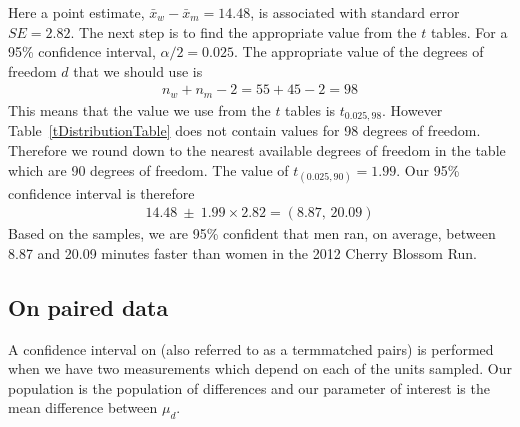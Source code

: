 Here a point estimate, $\bar{x}_{w} - \bar{x}_{m} = 14.48$, is associated with %
standard error $SE=2.82$. 
The next step is to find the appropriate value from the $t$ tables.
For a 95\% confidence interval, $\alpha/2 = 0.025$.
The appropriate value of the degrees of freedom $d$ that we should use is
\begin{align*}
n_{w} + n_{m} - 2 = 55 + 45 - 2 = 98
\end{align*}
This means that the value we use from the $t$ tables is $t_{0.025, 98}$.
However Table~\ref{tDistributionTable} does not contain values for 98 degrees of freedom.
Therefore we round down to the nearest available degrees of freedom in the table which
are 90 degrees of freedom.
The value of $t_{(0.025, 90)} = 1.99$.
Our 95\% confidence interval is therefore
\begin{eqnarray*}
14.48\  \pm \ 1.99 \times 2.82 = (8.87, \, 20.09)
\end{eqnarray*}
Based on the samples, we are 95\% confident that men ran, on average, between 8.87 and 20.09 minutes faster than women in the 2012 Cherry Blossom Run.\\












\subsection{On paired data}
\label{pairedData}
\label{sectionPairedData}


A confidence interval on  (also referred to as a term{matched pairs}) is performed when we have two measurements which depend on each of the units sampled.
Our population is the population of differences and our parameter of interest is the
mean difference between $\mu_{d}$.

